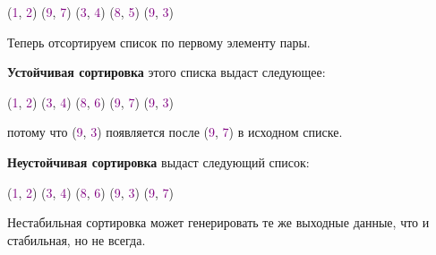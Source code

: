 \vspace{\baselineskip}

\begin{tcolorbox} 
(\textcolor{Purple}{1}, \textcolor{Purple}{2}) (\textcolor{Purple}{9}, \textcolor{Purple}{7}) (\textcolor{Purple}{3}, \textcolor{Purple}{4}) (\textcolor{Purple}{8}, \textcolor{Purple}{5}) (\textcolor{Purple}{9}, \textcolor{Purple}{3})
\end{tcolorbox}

\vspace{\baselineskip}

Теперь отсортируем список по первому элементу пары.

\vspace{\baselineskip}

\textbf{Устойчивая сортировка} этого списка выдаст следующее:

\vspace{\baselineskip}

\begin{tcolorbox} 
(\textcolor{Purple}{1}, \textcolor{Purple}{2}) (\textcolor{Purple}{3}, \textcolor{Purple}{4}) (\textcolor{Purple}{8}, \textcolor{Purple}{6}) (\textcolor{Purple}{9}, \textcolor{Purple}{7}) (\textcolor{Purple}{9}, \textcolor{Purple}{3})
\end{tcolorbox}

\vspace{\baselineskip}

потому что (\textcolor{Purple}{9}, \textcolor{Purple}{3}) появляется после (\textcolor{Purple}{9}, \textcolor{Purple}{7}) в исходном списке.

\vspace{\baselineskip}

\textbf{Неустойчивая сортировка} выдаст следующий список:

\vspace{\baselineskip}

\begin{tcolorbox} 
(\textcolor{Purple}{1}, \textcolor{Purple}{2}) (\textcolor{Purple}{3}, \textcolor{Purple}{4}) (\textcolor{Purple}{8}, \textcolor{Purple}{6}) (\textcolor{Purple}{9}, \textcolor{Purple}{3}) (\textcolor{Purple}{9}, \textcolor{Purple}{7})
\end{tcolorbox}

\vspace{\baselineskip}

Нестабильная сортировка может генерировать те же выходные данные, что и стабильная, но не всегда.

